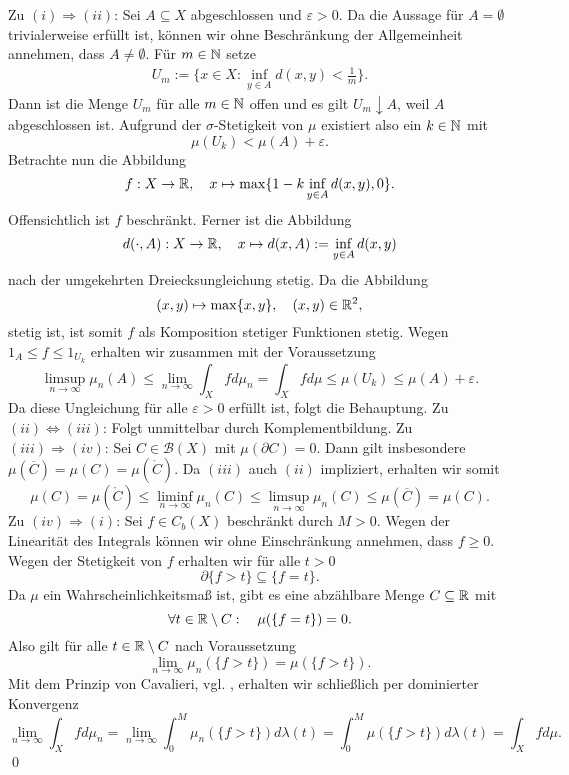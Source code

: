 \begin{proof*}
    Zu $(i) \Rightarrow (ii)$: Sei $A \subseteq X$ abgeschlossen und $\varepsilon > 0$. Da die Aussage für $A = \emptyset$ trivialerweise erfüllt ist,
    können wir ohne Beschränkung der Allgemeinheit annehmen, dass $A \neq \emptyset$. Für $m \in \mathbb{N}$ setze
    \begin{align*}
        U_m := \{x \in X: \inf_{y \in A}d(x,y) < \frac{1}{m}\}.
    \end{align*}
    Dann ist die Menge $U_m$ für alle $m \in \mathbb{N}$ offen und es gilt $U_m \downarrow A$, weil $A$ abgeschlossen ist.  
    Aufgrund der $\sigma$-Stetigkeit von $\mu$ existiert also ein $k \in \mathbb{N}$ mit 
    $$
        \mu(U_k) < \mu(A) + \varepsilon . 
    $$
    Betrachte nun die Abbildung 
    $$
        f:X \to \mathbb{R}, \quad x \mapsto \max\{1 - k \inf_{y \in A}d(x,y), 0\}.
    $$
    Offensichtlich ist $f$ beschränkt. Ferner ist die Abbildung 
    $$
        d(\cdot, A): X \to \mathbb{R}, \quad x \mapsto d(x,A) := \inf_{y \in A}d(x,y)
    $$
    nach der umgekehrten Dreiecksungleichung stetig. Da die Abbildung
    $$
        (x,y) \mapsto \max\{x,y\}, \quad (x,y) \in \mathbb{R}^2,
    $$
    stetig ist, ist somit $f$ als Komposition stetiger Funktionen stetig. 
    Wegen $1_A \leq f \leq 1_{U_k}$ erhalten wir zusammen mit der Voraussetzung 
    $$
    \limsup_{n \to \infty} \mu_n(A) \leq \lim_{n \to \infty} \int_X fd\mu_n = \int_X fd\mu \leq \mu(U_k) \leq \mu(A) + \varepsilon.
    $$
    Da diese Ungleichung für alle $\varepsilon > 0$ erfüllt ist, folgt die Behauptung. 
    \newline 
    Zu $(ii) \iff (iii)$: Folgt unmittelbar durch Komplementbildung. 
    \newline
    Zu $(iii) \Rightarrow (iv)$: 
    Sei $C \in \mathcal{B}(X)$ mit $\mu(\partial C) = 0$. Dann gilt insbesondere $\mu(\overline{C}) = \mu(C) = \mu(\mathring{C})$. Da $(iii)$ auch $(ii)$ impliziert, erhalten wir somit
    $$
        \mu(C) = \mu(\mathring{C}) \leq \liminf_{n \to \infty} \mu_n(C) \leq \limsup_{n \to \infty} \mu_n(C) \leq \mu(\overline{C}) = \mu(C).
    $$
    \newline 
    Zu $(iv) \Rightarrow (i)$: 
    Sei $f \in C_b(X)$ beschränkt durch $M > 0$. Wegen der Linearität des Integrals können wir ohne Einschränkung annehmen, dass $f \geq 0$. 
    Wegen der Stetigkeit von $f$ erhalten wir für alle $t > 0$
    $$
        \partial\{ f > t \} \subseteq \{f = t \}. 
    $$
    Da $\mu$ ein Wahrscheinlichkeitsmaß ist, gibt es eine abzählbare Menge $C \subseteq \mathbb{R}$ mit 
    $$
        \forall t \in \mathbb{R} \setminus C: \quad \mu(\{f = t \}) = 0. 
    $$
    Also gilt für alle $t \in \mathbb{R} \setminus C$ nach Voraussetzung 
    $$
        \lim_{n \to \infty} \mu_n(\{f > t \}) = \mu(\{f > t \}).
    $$
    Mit dem Prinzip von Cavalieri, vgl. \cite[Satz 1.8.20]{gs}, erhalten wir schließlich per dominierter Konvergenz
    $$
        \lim_{n \to \infty} \int_X fd\mu_n = \lim_{n \to \infty} \int_0^M \mu_n(\{f > t \})d\lambda(t) = \int_0^M \mu(\{f > t \}) d\lambda(t) = \int_Xfd\mu. 
    $$
    \qed 
\end{proof*}